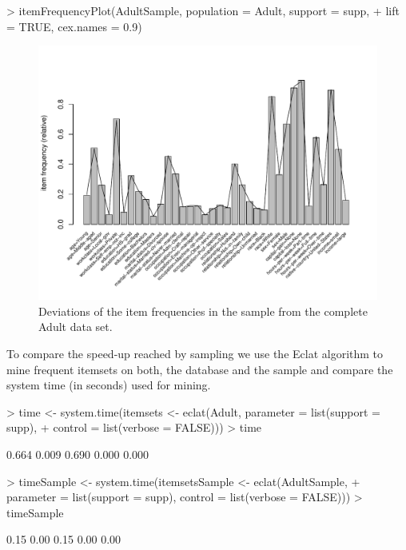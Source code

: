 \documentclass[10pt,a4paper]{article}
\begin{document}
\begin{Schunk}
\begin{Sinput}
> itemFrequencyPlot(AdultSample, population = Adult, support = supp, 
+     lift = TRUE, cex.names = 0.9)
\end{Sinput}
\end{Schunk}
\begin{figure}
\centering
\includegraphics{arules-035}
\caption{Deviations of the item frequencies in the sample from 
the complete Adult data set.}
\label{fig:itemFrequencyPlot3}
\end{figure}

To compare the speed-up reached by sampling we use the Eclat algorithm
to mine frequent itemsets on both, the database and the sample
and compare the system time (in seconds) used for mining.

\begin{Schunk}
\begin{Sinput}
> time <- system.time(itemsets <- eclat(Adult, parameter = list(support = supp), 
+     control = list(verbose = FALSE)))
> time
\end{Sinput}
\begin{Soutput}
[1] 0.664 0.009 0.690 0.000 0.000
\end{Soutput}
\begin{Sinput}
> timeSample <- system.time(itemsetsSample <- eclat(AdultSample, 
+     parameter = list(support = supp), control = list(verbose = FALSE)))
> timeSample
\end{Sinput}
\begin{Soutput}
[1] 0.15 0.00 0.15 0.00 0.00
\end{Soutput}
\end{Schunk}
\end{document}
